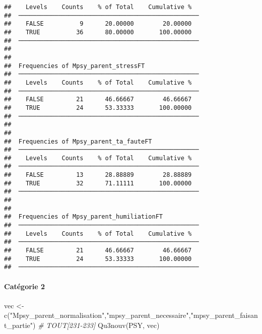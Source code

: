 \documentclass[
]{article}
\newenvironment{Shaded}{\begin{snugshade}}{\end{snugshade}}
\newcommand{\CommentTok}[1]{\textcolor[rgb]{0.56,0.35,0.01}{\textit{#1}}}
\newcommand{\FunctionTok}[1]{\textcolor[rgb]{0.00,0.00,0.00}{#1}}
\newcommand{\NormalTok}[1]{#1}
\newcommand{\OtherTok}[1]{\textcolor[rgb]{0.56,0.35,0.01}{#1}}
\newcommand{\StringTok}[1]{\textcolor[rgb]{0.31,0.60,0.02}{#1}}
\begin{document}
\begin{verbatim}
##    Levels    Counts    % of Total    Cumulative %   
##  ────────────────────────────────────────────────── 
##    FALSE          9      20.00000        20.00000   
##    TRUE          36      80.00000       100.00000   
##  ────────────────────────────────────────────────── 
## 
## 
##  Frequencies of Mpsy_parent_stressFT                
##  ────────────────────────────────────────────────── 
##    Levels    Counts    % of Total    Cumulative %   
##  ────────────────────────────────────────────────── 
##    FALSE         21      46.66667        46.66667   
##    TRUE          24      53.33333       100.00000   
##  ────────────────────────────────────────────────── 
## 
## 
##  Frequencies of Mpsy_parent_ta_fauteFT              
##  ────────────────────────────────────────────────── 
##    Levels    Counts    % of Total    Cumulative %   
##  ────────────────────────────────────────────────── 
##    FALSE         13      28.88889        28.88889   
##    TRUE          32      71.11111       100.00000   
##  ────────────────────────────────────────────────── 
## 
## 
##  Frequencies of Mpsy_parent_humiliationFT           
##  ────────────────────────────────────────────────── 
##    Levels    Counts    % of Total    Cumulative %   
##  ────────────────────────────────────────────────── 
##    FALSE         21      46.66667        46.66667   
##    TRUE          24      53.33333       100.00000   
##  ──────────────────────────────────────────────────
\end{verbatim}

\hypertarget{catuxe9gorie-2-2}{%
\paragraph{Catégorie 2}\label{catuxe9gorie-2-2}}

\begin{Shaded}
\begin{Highlighting}[]
\NormalTok{vec }\OtherTok{\textless{}{-}} \FunctionTok{c}\NormalTok{(}\StringTok{"Mpsy\_parent\_normalisation"}\NormalTok{,}\StringTok{"mpsy\_parent\_necessaire"}\NormalTok{,}\StringTok{"mpsy\_parent\_faisant\_partie"}\NormalTok{)  }\CommentTok{\# TOUT[231{-}233]}
\FunctionTok{Qu3nouv}\NormalTok{(PSY, vec)}
\end{Highlighting}
\end{Shaded}
\end{document}
